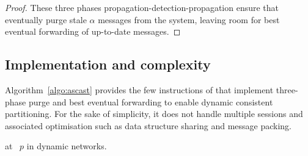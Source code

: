 \begin{proof}
  
  These three phases propagation-detection-propagation ensure that
  \processes eventually purge stale $\alpha$ messages from the system,
  leaving room for best eventual forwarding of up-to-date messages.
\end{proof}



\subsection{Implementation and complexity}

Algorithm~\ref{algo:ascast} provides the few instructions of \NAME
that implement three-phase purge and best eventual forwarding to
enable dynamic consistent partitioning. For the sake of simplicity, it
does not handle multiple sessions and associated optimisation such as
data structure sharing and message packing.

\begin{algorithm}[h!]
  
  \caption{\label{algo:ascast}\NAME at \Process~$p$ in dynamic networks.}
\end{algorithm}

